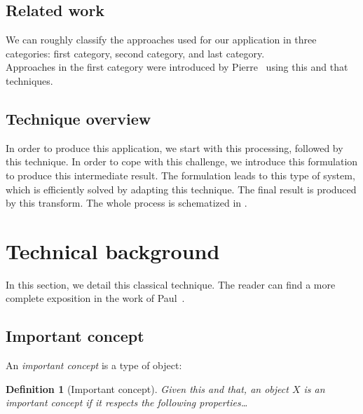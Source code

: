 \documentclass[10pt, conference]{IEEEtran}
\newtheorem{definition}{Definition}
\begin{document}
\subsection{Related work}
%
We can roughly classify the approaches used for our application in three categories: first category, second category, and last category.\\
Approaches in the first category were introduced by Pierre~\cite{Sibgrapi2015} using this and that techniques.


\subsection{Technique overview}
%
In order to produce this application, we start with this processing, followed by this technique. In order to cope with this challenge, we introduce this formulation to produce this intermediate result. The formulation leads to this type of system, which is efficiently solved by adapting this technique. The final result is produced by this transform. The whole process is schematized in .



\section{Technical background}
%
In this section, we detail this classical technique. The reader can find a more complete exposition in the work of Paul~\cite{Sibgrapi2015}.


\subsection{Important concept}
%
An \emph{important concept} is a type of object:
\begin{definition}[Important concept]
Given this and that, an object $X$ is an important concept if it respects the following properties\ldots{}
\end{definition}


\end{document}
